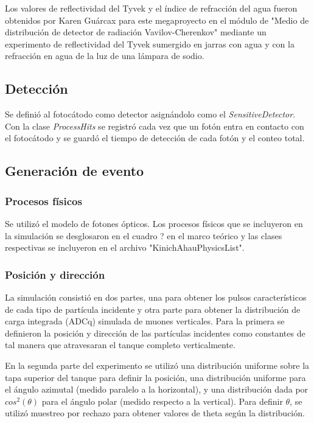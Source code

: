 \documentclass{book}
\begin{document}
Los valores de reflectividad del Tyvek y el \'indice de refracci\'on del agua fueron obtenidos por Karen Gu\'arcax para este megaproyecto en el m\'odulo de "Medio de distribuci\'on de detector de radiaci\'on Vavilov-Cherenkov" mediante un experimento de reflectividad del Tyvek sumergido en jarras con agua y con la refracci\'on en agua de la luz de una l\'ampara de sodio.

\subsection{Detecci\'on}
Se defini\'o al fotoc\'atodo como detector asign\'andolo como el \textit{SensitiveDetector}. Con la clase \textit{ProcessHits} se registr\'o cada vez que un fot\'on entra en contacto con el fotoc\'atodo y se guard\'o el tiempo de detecci\'on de cada fot\'on y el conteo total.

\subsection{Generaci\'on de evento}

\subsubsection{Procesos f\'isicos}
Se utiliz\'o el modelo de fotones \'opticos. Los procesos f\'isicos que se incluyeron en la simulaci\'on se desglosaron en el cuadro ? en el marco te\'orico y las clases respectivas se incluyeron en el archivo "KinichAhauPhysicsList".

\subsubsection{Posici\'on y direcci\'on}
La simulaci\'on consisti\'o en dos partes, una para obtener los pulsos caracter\'isticos de cada tipo de part\'icula incidente y otra parte para obtener la distribuci\'on de carga integrada (ADCq) simulada de muones verticales. Para la primera se definieron la posici\'on y direcci\'on de las part\'iculas incidentes como constantes de tal manera que atravesaran el tanque completo verticalmente.

En la segunda parte del experimento se utiliz\'o una distribuci\'on uniforme sobre la tapa superior del tanque para definir la posici\'on, una distribuci\'on uniforme para el \'angulo azimutal (medido paralelo a la horizontal), y una distribuci\'on dada por $cos^2(\theta)$ para el \'angulo polar (medido respecto a la vertical). Para definir $\theta$, se utiliz\'o muestreo por rechazo para obtener valores de theta seg\'un la distribuci\'on.
\end{document}
